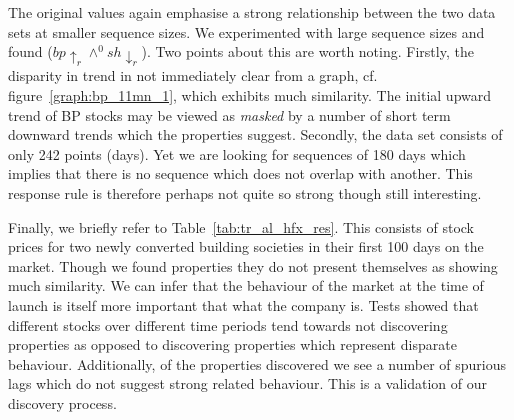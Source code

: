 The original values again emphasise a strong relationship between the
two data sets at smaller sequence sizes. We experimented with large
sequence sizes and found 
 ($bp \uparrow_r \wedge^0 sh \downarrow_r$). Two points
about this are worth noting. Firstly, the disparity in trend in not
immediately clear from a graph, cf. figure~\ref{graph:bp_11mn_1},
which exhibits much similarity. The initial upward trend of BP stocks
may be viewed as {\em masked} by a number of short term downward
trends which the properties suggest.
Secondly, the data set consists of
only 242 points (days). Yet we are looking for sequences of 180 days
which implies that there is no sequence which does not overlap with
another. This response rule is therefore perhaps not quite so strong
though still interesting. 

\medskip

Finally, we briefly refer to Table~\ref{tab:tr_al_hfx_res}. This
consists of stock prices for two newly converted building societies in
their first 100 days on the market. Though we found properties they do
not present themselves as showing much similarity. We can infer that
the behaviour of the market at the time of launch is itself more
important that what the company is. Tests showed that different stocks
over different time periods tend towards not discovering properties as
opposed to discovering properties which represent disparate
behaviour.  Additionally, of the properties discovered we see a number
of spurious lags which do not suggest strong related behaviour. This
is a validation of our discovery process. 
 
